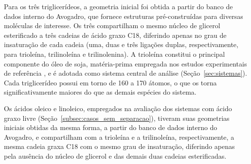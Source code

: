 Para os três triglicerídeos, a geometria inicial foi obtida a partir do banco de dados interno do Avogadro, que fornece estruturas pré-construídas para diversas moléculas de interesse. Os três compartilham o mesmo núcleo de glicerol esterificado a três cadeias de ácido graxo C18, diferindo apenas no grau de insaturação de cada cadeia (uma, duas e três ligações duplas, respectivamente, para trioleína, trilinoleína e trilinolenina). A trioleína constitui o principal componente do óleo de soja, matéria-prima empregada nos estudos experimentais de referência \cite{trindade2019,gomez2019}, e é adotada como sistema central de análise (Seção~\ref{sec:sistemas}). Cada triglicerídeo possui em torno de 160 a 170 átomos, o que os torna significativamente maiores do que as demais espécies do sistema.

Os ácidos oleico e linoleico, empregados na avaliação dos sistemas com ácido graxo livre (Seção~\ref{subsec:casos_sem_separacao}), tiveram suas geometrias iniciais obtidas da mesma forma, a partir do banco de dados interno do Avogadro, e compartilham com a trioleína e a trilinoleína, respectivamente, a mesma cadeia graxa C18 com o mesmo grau de insaturação, diferindo apenas pela ausência do núcleo de glicerol e das demais duas cadeias esterificadas.

